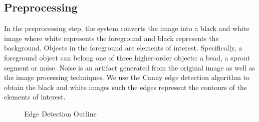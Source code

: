 \documentclass{sig-alternate}
\begin{document}
	\subsection{Preprocessing} %
	\label{sub:Preprocessing}

	In the preprocessing step, the system converts the image into a black
	and white image where white represents the foreground and black
	represents the background. Objects in the foreground are elements of
	interest. Specifically, a foreground object can belong one of three
	higher-order objects: a bead, a sprout segment or noise. Noise is an
	artifact generated from the original image as well as the image
	processing techniques. We use the Canny edge detection algorithm
	\cite{canny86} to obtain the black and white images such the edges
	represent the contours of the elements of interest.
	\begin{figure}[htp!]
		\centering
		\caption{Edge Detection Outline}
		\label{fig:beadex}
	\end{figure}
	
\end{document}
